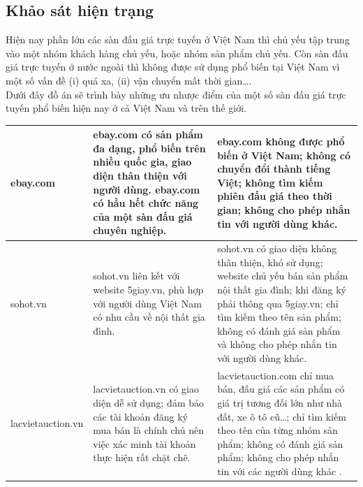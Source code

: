 \documentclass{article}
\begin{document}
\subsection{Khảo sát hiện trạng}
Hiện nay phần lớn các sàn đấu giá trực tuyến ở Việt Nam thì chủ yếu tập trung vào một nhóm khách hàng chủ yếu, hoặc nhóm sản phẩm chủ yếu. Còn sàn đấu giá trực tuyến ở nước ngoài thì không được sử dụng phổ biến tại Việt Nam vì một số vấn đề (i) quá xa, (ii) vận chuyển mất thời gian….\\
Dưới đây đồ án sẽ trình bày những ưu nhược điểm của một số sàn đấu giá trực tuyến phổ biến hiện nay ở cả Việt Nam và trên thế giới.
    \tabletail{\hline}
    \label{bang21}
    \begin{supertabular}{| p{.20\textwidth} | p{.30\textwidth} | p{.415\textwidth} |} 
        ebay.com &  ebay.com có sản phẩm đa dạng, phổ biến trên nhiều quốc gia, giao diện thân thiện với người dùng.
        ebay.com có hầu hết chức năng của một sàn đấu giá chuyên nghiệp.
        &  ebay.com không được phổ biến ở Việt Nam; không có chuyển đổi thành tiếng Việt; không tìm kiếm phiên đấu giá theo thời gian; không cho phép nhắn tin với người dùng khác.\\\hline
        sohot.vn &  sohot.vn liên kết với website 5giay.vn, phù hợp với người dùng Việt Nam có nhu cầu về nội thất gia đình.&  sohot.vn có giao diện không thân thiện, khó sử dụng; website chủ yếu bán sản phẩm nội thất gia đình; khi đăng ký phải thông qua 5giay.vn; chỉ tìm kiếm theo tên sản phẩm; không có đánh giá sản phẩm và không cho phép nhắn tin với người dùng khác.\\\hline
        lacvietauction.vn & lacvietauction.vn có giao diện dễ sử dụng; đảm bảo các tài khoản đăng ký mua bán là chính chủ nên việc xác minh tài khoản thực hiện rất chặt chẽ. & lacvietauction.com chỉ mua bán, đấu giá các sản phẩm có giá trị tương đối lớn như nhà đất, xe ô tô cũ…; chỉ tìm kiếm theo tên của từng nhóm sản phẩm; không có đánh giá sản phẩm; không cho phép nhắn tin với các người dùng khác .\\\hline
    \end{supertabular}\\
\\
\end{document}
